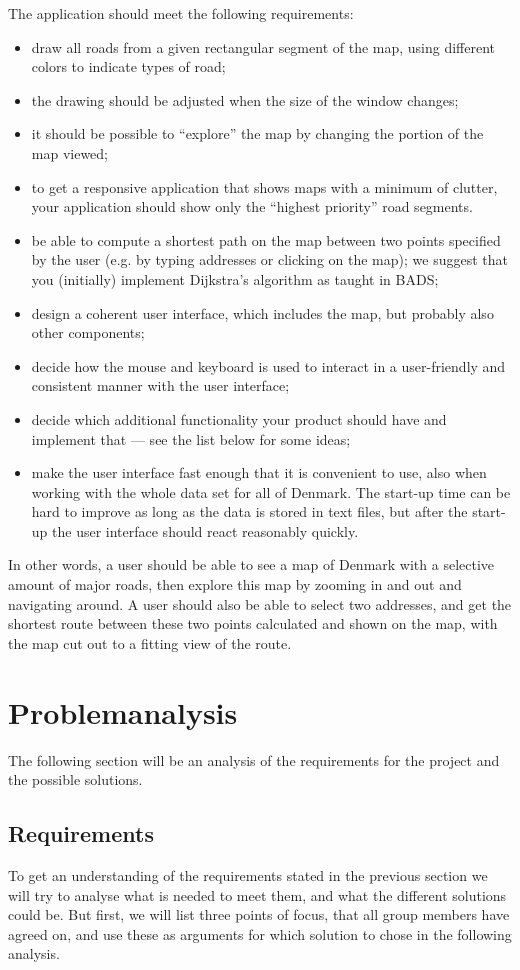 \documentclass[a4paper,10pt,titlepage]{article}
\begin{document}
		The application should meet the following requirements:
		\begin{itemize}
		\item draw all roads from a given rectangular segment of the map, using different colors to indicate types of road;
\item the drawing should be adjusted when the size of the window changes;
\item it should be possible to “explore” the map by changing the portion of the map viewed;
\item to get a responsive application that shows maps with a minimum of clutter, your application should show only the “highest priority” road segments.
\item be able to compute a shortest path on the map between two points specified by the user (e.g. by typing addresses or clicking on the map); we suggest that you (initially) implement Dijkstra’s algorithm as taught in BADS;
\item design a coherent user interface, which includes the map, but probably also other components;
\item decide how the mouse and keyboard is used to interact in a user-friendly and consistent
manner with the user interface;
\item decide which additional functionality your product should have and implement that — see the list below for some ideas;
\item make the user interface fast enough that it is convenient to use, also when working with the whole data set for all of Denmark. The start-up time can be hard to improve as long as the data is stored in text files, but after the start-up the user interface should react reasonably quickly.
		\end{itemize}
		
		In other words, a user should be able to see a map of Denmark with a selective amount of major roads, then explore this map by zooming in and out and navigating around. A user should also be able to select two addresses, and get the shortest route between these two points calculated and shown on the map, with the map cut out to a fitting view of the route.

	\newpage
	\section{Problemanalysis}
The following section will be an analysis of the requirements for the project and the possible solutions.
		\subsection{Requirements}
To get an understanding of the requirements stated in the previous section we will try to analyse what is needed to meet them, and what the different solutions could be. But first, we will list three points of focus, that all group members have agreed on, and use these as arguments for which solution to chose in the following analysis.\\
\end{document}
